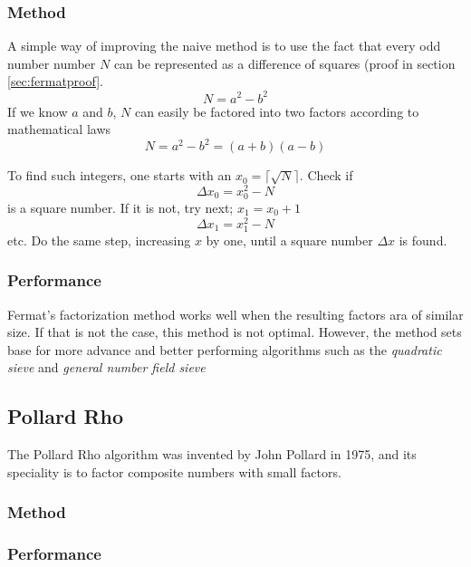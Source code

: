 \documentclass[a4paper, 12pt]{report}
\begin{document}
\subsubsection{Method}
A simple way of improving the naive method is to use the fact that every odd number number $N$ can be represented as a difference of squares (proof in section \ref{sec:fermatproof}.
\begin{equation}
N = a^2 - b^2
\end{equation}
If we know $a$ and $b$, $N$ can easily be factored into two factors according to mathematical laws
\begin{equation}
N = a^2 - b^2 = (a + b)(a - b)
\end{equation}

To find such integers, one starts with an $x_0 = \lceil \sqrt{N} \rceil $. Check if 
\begin{equation}
\Delta x_0 = x_0^2 - N
\end{equation}
is a square number. If it is not, try next; $x_1 = x_0 + 1$
\begin{equation}
\Delta x_1 = x_1^2 - N
\end{equation}
etc. Do the same step, increasing $x$ by one, until a square number $ \Delta x $ is found.

\subsubsection{Performance}
Fermat's factorization method works well when the resulting factors ara of similar size. If that is not the case, this method is not optimal. However, the method sets base for more advance and better performing algorithms such as the \emph{quadratic sieve} and \emph{general number field sieve}

\subsection{Pollard Rho}
The Pollard Rho algorithm was invented by John Pollard in 1975, and its speciality is to factor composite numbers with small factors.

\subsubsection{Method}
\subsubsection{Performance}
\end{document}
